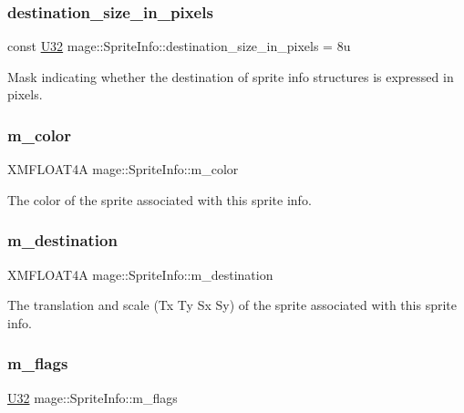 \subsubsection{\texorpdfstring{destination\+\_\+size\+\_\+in\+\_\+pixels}{destination\_size\_in\_pixels}}
{\footnotesize\ttfamily const \hyperlink{namespacemage_a41c104c036fba3756a74e19f793eeaa1}{U32} mage\+::\+Sprite\+Info\+::destination\+\_\+size\+\_\+in\+\_\+pixels = 8u\hspace{0.3cm}{\ttfamily [static]}}

Mask indicating whether the destination of sprite info structures is expressed in pixels. \hypertarget{structmage_1_1_sprite_info_ab76316069522fc10f9580b705406ed16}{}\label{structmage_1_1_sprite_info_ab76316069522fc10f9580b705406ed16} 
\subsubsection{\texorpdfstring{m\+\_\+color}{m\_color}}
{\footnotesize\ttfamily X\+M\+F\+L\+O\+A\+T4A mage\+::\+Sprite\+Info\+::m\+\_\+color}

The color of the sprite associated with this sprite info. \hypertarget{structmage_1_1_sprite_info_a40a00e6cf76fc333309d706f064deed8}{}\label{structmage_1_1_sprite_info_a40a00e6cf76fc333309d706f064deed8} 
\subsubsection{\texorpdfstring{m\+\_\+destination}{m\_destination}}
{\footnotesize\ttfamily X\+M\+F\+L\+O\+A\+T4A mage\+::\+Sprite\+Info\+::m\+\_\+destination}

The translation and scale (Tx Ty Sx Sy) of the sprite associated with this sprite info. \hypertarget{structmage_1_1_sprite_info_a9f3802944651a58e02831e5f2cb4a53e}{}\label{structmage_1_1_sprite_info_a9f3802944651a58e02831e5f2cb4a53e} 
\subsubsection{\texorpdfstring{m\+\_\+flags}{m\_flags}}
{\footnotesize\ttfamily \hyperlink{namespacemage_a41c104c036fba3756a74e19f793eeaa1}{U32} mage\+::\+Sprite\+Info\+::m\+\_\+flags}

